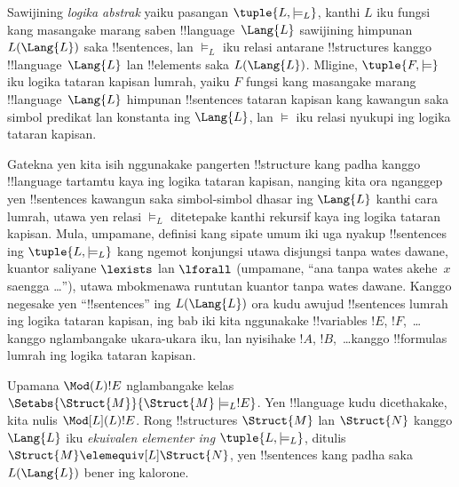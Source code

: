 \documentclass[../../../include/open-logic-section]{subfiles}
\begin{document}

\begin{defn}
Sawijining \emph{logika abstrak} yaiku pasangan $\tuple{L, \models_L}$,
kanthi $L$ iku fungsi kang masangake marang saben !!{language}~$\Lang{L}$
sawijining himpunan $L(\Lang{L})$ saka !!{sentence}s, lan $\models_L$
iku relasi antarane !!{structure}s kanggo !!{language}~$\Lang{L}$
lan !!{element}s saka $L(\Lang{L})$. Mligine, $\tuple{F, \models}$
iku logika tataran kapisan lumrah, yaiku $F$ fungsi kang masangake marang
!!{language}~$\Lang{L}$ himpunan !!{sentence}s tataran kapisan kang
kawangun saka simbol predikat lan konstanta ing $\Lang{L}$, lan $\models$ iku relasi
nyukupi ing logika tataran kapisan.
\end{defn}

Gatekna yen kita isih nggunakake pangerten !!{structure} kang padha
kanggo !!{language} tartamtu kaya ing logika tataran kapisan, nanging kita
ora nganggep yen !!{sentence}s kawangun saka simbol-simbol dhasar ing
$\Lang{L}$ kanthi cara lumrah, utawa yen relasi $\models_L$
ditetepake kanthi rekursif kaya ing logika tataran kapisan. Mula, umpamane,
definisi kang sipate umum iki uga nyakup !!{sentence}s ing
$\tuple{L,\models_L}$ kang ngemot konjungsi utawa disjungsi tanpa wates
dawane, kuantor saliyane $\lexists$ lan $\lforall$ (umpamane,
“ana tanpa wates akehe~$x$ saengga \dots”), utawa mbokmenawa
runtutan kuantor tanpa wates dawane. Kanggo negesake yen
“!!{sentence}s” ing $L(\Lang{L})$ ora kudu awujud !!{sentence}s
lumrah ing logika tataran kapisan, ing bab iki kita nggunakake
!!{variable}s $!E$, $!F$,~\dots kanggo nglambangake ukara-ukara iku,
lan nyisihake $!A$, $!B$,~\dots kanggo !!{formula}s lumrah ing
logika tataran kapisan.

\begin{defn}
Upamana $\Mod(L){!E}$ nglambangake kelas
$\Setabs{\Struct{M}}{\Struct{M} \models_L !E}$. Yen !!{language}
kudu dicethakake, kita nulis $\Mod[L](L){!E}$. Rong !!{structure}s
$\Struct{M}$ lan $\Struct{N}$ kanggo $\Lang{L}$ iku
\emph{ekuivalen elementer ing} $\tuple{L, \models_L}$, ditulis
$\Struct{M} \elemequiv[L] \Struct{N}$, yen !!{sentence}s kang
padha saka $L(\Lang{L})$ bener ing kalorone.
\end{defn}
\end{document}
